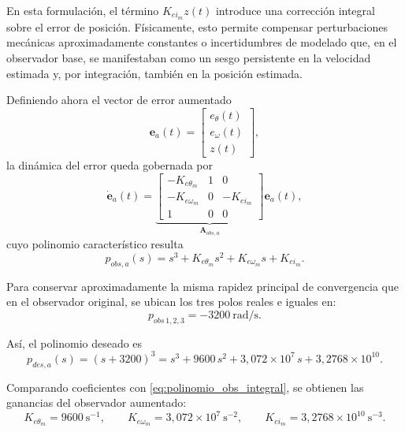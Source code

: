 \documentclass[12pt, a4paper,journal, onecolumn, compsoc]{IEEEtran}
\begin{document}
En esta formulación, el término $K_{ei_m}z(t)$ introduce una corrección integral sobre el error de posición. Físicamente, esto permite compensar perturbaciones mecánicas aproximadamente constantes o incertidumbres de modelado que, en el observador base, se manifestaban como un sesgo persistente en la velocidad estimada y, por integración, también en la posición estimada.

Definiendo ahora el vector de error aumentado
\begin{equation}
\mathbf e_a(t)=
\begin{bmatrix}
e_\theta(t)\\
e_\omega(t)\\
z(t)
\end{bmatrix},
\end{equation}
la dinámica del error queda gobernada por
\begin{equation}
\dot{\mathbf e}_a(t)=
\underbrace{
\begin{bmatrix}
-K_{e\theta_m} & 1 & 0\\
-K_{e\omega_m} & 0 & -K_{ei_m}\\
1 & 0 & 0
\end{bmatrix}
}_{\mathbf A_{obs,a}}
\mathbf e_a(t),
\end{equation}
cuyo polinomio característico resulta
\begin{equation}
\label{eq:polinomio_obs_integral}
p_{obs,a}(s)=s^3+K_{e\theta_m}s^2+K_{e\omega_m}s+K_{ei_m}.
\end{equation}

Para conservar aproximadamente la misma rapidez principal de convergencia que en el observador original, se ubican los tres polos reales e iguales en:
\begin{equation}
p_{obs\,1,2,3}=-3200\ \text{rad/s}.
\end{equation}

Así, el polinomio deseado es
\begin{equation}
p_{des,a}(s)=(s+3200)^3
=s^3+9600\,s^2+3{,}072\times10^7\,s+3{,}2768\times10^{10}.
\end{equation}

Comparando coeficientes con \eqref{eq:polinomio_obs_integral}, se obtienen las ganancias del observador aumentado:
\begin{equation}
\label{eq:ganancias_obs_integral}
K_{e\theta_m}=9600\ \mathrm{s}^{-1},
\qquad
K_{e\omega_m}=3{,}072\times10^7\ \mathrm{s}^{-2},
\qquad
K_{ei_m}=3{,}2768\times10^{10}\ \mathrm{s}^{-3}.
\end{equation}
\end{document}
